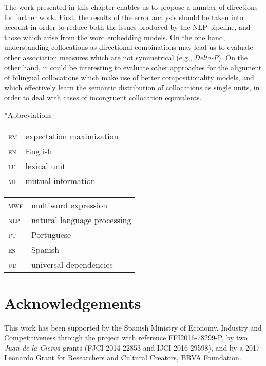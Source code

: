\documentclass[output=paper
,modfonts
,nonflat]{langsci/langscibook}
\begin{document}
The work presented in this chapter enables us to propose a number of directions for
further work. First, the results of the error analysis should be taken into account
in order to reduce both the issues produced by the NLP pipeline, and those
which arise from the word embedding models. On the one hand, understanding collocations
as directional combinations may lead us to evaluate other association measures
which are not symmetrical (e.g., \emph{Delta-P}). On the other hand, it could be
interesting to evaluate other approaches for the alignment of bilingual collocations
which make use of better compositionality models, and which effectively learn the semantic
distribution of collocations as single units, in order to deal with cases of incongruent
collocation equivalents.


\begin{section}*{Abbreviations}
    \begin{tabularx}{.49\textwidth}{ll}
      \textsc{em} &   expectation maximization    \\
      \textsc{en} &   English    \\
      \textsc{lu}  &  lexical unit \\
      \textsc{mi} & mutual information    \\      
       \end{tabularx}
      \begin{tabularx}{.49\textwidth}{ll}      
      \textsc{mwe} &  multiword expression  \\            
      \textsc{nlp}  & natural language processing\\
      \textsc{pt} &  Portuguese    \\
      \textsc{es} &   Spanish    \\      
      \textsc{ud} &     universal dependencies  \\
    \end{tabularx}
\end{section}


\section*{Acknowledgements}
This work has been supported by the Spanish Ministry of Economy, Industry and
Competitiveness through the project with reference FFI2016-78299-P,
by two \emph{Juan de la Cierva} grants (FJCI-2014-22853 and IJCI-2016-29598),
and by a 2017 Leonardo Grant for Researchers and Cultural Creators, BBVA Foundation.

\printbibliography[heading=subbibliography,notkeyword=this]
\end{document}

